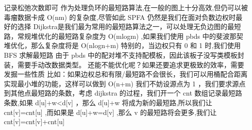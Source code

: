 {}\markdownRendererDollarSign{}记录松弛次数即可\markdownRendererParagraphSeparator
{}作为处理负环的最短路算法,在一般的图上十分高效,但仍可以被毒瘤数据卡成\markdownRendererDollarSign{} O(nm) \markdownRendererDollarSign{}的复杂度,尽管如此\markdownRendererDollarSign{} SPFA\markdownRendererSoftLineBreak
{}\markdownRendererDollarSign{}仍然是我们在面对负数边权时最好的选择\markdownRendererInterblockSeparator
{}\markdownRendererInterblockSeparator
{}
\markdownRendererSectionEnd \markdownRendererSectionBegin
{}\markdownRendererInterblockSeparator
{}Dijkstra是我们最为常用的最短路算法之一，可以处理无负边图的最短路，常规堆优化的最短路复杂度为\markdownRendererDollarSign{} O(mlogm) \markdownRendererDollarSign{},如果我们使用\markdownRendererDollarSign{} pbds \markdownRendererDollarSign{}中的斐波那契堆优化，那么复杂度将是\markdownRendererDollarSign{} O(nlogn+m) \markdownRendererDollarSign{}\markdownRendererParagraphSeparator
{}特别的，当边权只有\markdownRendererDollarSign{} 0 \markdownRendererDollarSign{}和\markdownRendererDollarSign{} 1 \markdownRendererDollarSign{}时,我们使用\markdownRendererDollarSign{} BFS\markdownRendererSoftLineBreak
{}\markdownRendererDollarSign{}求解最短路\markdownRendererParagraphSeparator
{}由于\markdownRendererDollarSign{} pbds \markdownRendererDollarSign{}中的配对堆不支持配模板，因此该板子没写类模板封装，需要手动改数据类型。\markdownRendererInterblockSeparator
{}\markdownRendererInterblockSeparator
{}还能不能优化呢？如果还要追求更极致的效率，需要发掘一些性质\markdownRendererParagraphSeparator
{}比如：如果边权总和有限/最短路不会很长，我们可以用桶配合距离实现最小堆的功能，这样可以做到\markdownRendererDollarSign{} O(n+m) \markdownRendererDollarSign{}\markdownRendererInterblockSeparator
{}
\markdownRendererSectionEnd \markdownRendererSectionBegin
{}\markdownRendererInterblockSeparator
{}我们不妨设源点为\markdownRendererDollarSign{} 1 \markdownRendererDollarSign{}，我们要求源点到其他点最短路的条数，考虑\markdownRendererDollarSign{} dijkstra \markdownRendererDollarSign{}的过程，我们开一个\markdownRendererDollarSign{} cnt \markdownRendererDollarSign{}数组记录最短路条数,如果\markdownRendererDollarSign{} d[u]+w<d[v] \markdownRendererDollarSign{}，那么\markdownRendererDollarSign{} d[u]+w \markdownRendererDollarSign{}将成为新的最短路,所以我们让\markdownRendererDollarSign{} cnt[v]=cnt[u] \markdownRendererDollarSign{},而如果是\markdownRendererDollarSign{} d[u]+w=d[v] \markdownRendererDollarSign{},那么\markdownRendererDollarSign{} v \markdownRendererDollarSign{}的最短路将会更多,我们让\markdownRendererDollarSign{} cnt[v]=cnt[v]+cnt[u] \markdownRendererDollarSign{}\markdownRendererParagraphSeparator
